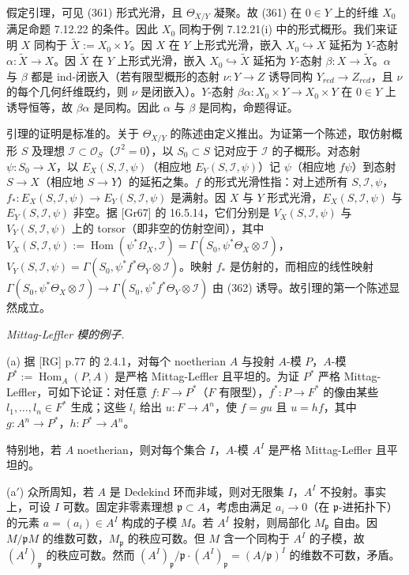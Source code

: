 假定引理，可见 (361) 形式光滑，且 $\Theta_{X/Y}$ 凝聚。故 (361) 在 $0\in Y$ 上的纤维 $X_0$ 满足命题 7.12.22 的条件。因此 $X_0$ 同构于例 7.12.21(i) 中的形式概形。我们来证明 $X$ 同构于 $\tilde X:=X_0\times Y$。因 $X$ 在 $Y$ 上形式光滑，嵌入 $X_0\hookrightarrow X$ 延拓为 $Y$-态射 $\alpha:\tilde X\to X$。因 $\tilde X$ 在 $Y$ 上形式光滑，嵌入 $X_0\hookrightarrow\tilde X$ 延拓为 $Y$-态射 $\beta:X\to\tilde X$。$\alpha$ 与 $\beta$ 都是 ind-闭嵌入（若有限型概形的态射 $\nu:Y\to Z$ 诱导同构 $Y_{red}\to Z_{red}$，且 $\nu$ 的每个几何纤维既约，则 $\nu$ 是闭嵌入）。$Y$-态射 $\beta\alpha:X_0\times Y\to X_0\times Y$
%
在 $0\in Y$ 上诱导恒等，故 $\beta\alpha$ 是同构。因此 $\alpha$ 与 $\beta$ 是同构，命题得证。

引理的证明是标准的。关于 $\Theta_{X/Y}$ 的陈述由定义推出。为证第一个陈述，取仿射概形 $S$ 及理想 $\mathcal{I}\subset\mathcal{O}_S$（$\mathcal{I}^2=0$），以 $S_0\subset S$ 记对应于 $\mathcal{I}$ 的子概形。对态射 $\psi:S_0\to X$，以 $E_X(S,\mathcal{I},\psi)$（相应地 $E_Y(S,\mathcal{I},\psi)$）记 $\psi$（相应地 $f\psi$）到态射 $S\to X$（相应地 $S\to Y$）的延拓之集。$f$ 的形式光滑性指：对上述所有 $S,\mathcal{I},\psi$，$f_*:E_X(S,\mathcal{I},\psi)\to E_Y(S,\mathcal{I},\psi)$ 是满射。因 $X$ 与 $Y$ 形式光滑，$E_X(S,\mathcal{I},\psi)$ 与 $E_Y(S,\mathcal{I},\psi)$ 非空。据 [Gr67] 的 16.5.14，它们分别是 $V_X(S,\mathcal{I},\psi)$ 与 $V_Y(S,\mathcal{I},\psi)$ 上的 torsor（即非空的仿射空间），其中 $V_X(S,\mathcal{I},\psi):=\operatorname{Hom}(\psi^*\Omega_X,\mathcal{I})=\Gamma(S_0,\psi^*\Theta_X\otimes\mathcal{I})$，$V_Y(S,\mathcal{I},\psi)=\Gamma(S_0,\psi^*f^*\Theta_Y\otimes\mathcal{I})$。映射 $f_*$ 是仿射的，而相应的线性映射 $\Gamma(S_0,\psi^*\Theta_X\otimes\mathcal{I})\to\Gamma(S_0,\psi^*f^*\Theta_Y\otimes\mathcal{I})$ 由 (362) 诱导。故引理的第一个陈述显然成立。

 \emph{Mittag-Leffler 模的例子.}

(a) 据 [RG] p.77 的 2.4.1，对每个 noetherian $A$ 与投射 $A$-模 $P$，$A$-模 $P^*:=\operatorname{Hom}_A(P,A)$ 是严格 Mittag-Leffler 且平坦的。为证 $P^*$ 严格 Mittag-Leffler，可如下论证：对任意 $f:F\to P^*$（$F$ 有限型），$f^*:P\to F^*$ 的像由某些 $l_1,\ldots,l_n\in F^*$ 生成；这些 $l_i$ 给出 $u:F\to A^n$，使 $f=gu$ 且 $u=hf$，其中 $g:A^n\to P^*$，$h:P^*\to A^n$。

特别地，若 $A$ noetherian，则对每个集合 $I$，$A$-模 $A^I$ 是严格 Mittag-Leffler 且平坦的。

(a$'$) 众所周知，若 $A$ 是 Dedekind 环而非域，则对无限集 $I$，$A^I$ 不投射。事实上，可设 $I$ 可数。固定非零素理想 $\mathfrak{p}\subset A$，考虑由满足 $a_i\to 0$（在 $\mathfrak{p}$-进拓扑下）的元素 $a=(a_i)\in A^I$ 构成的子模 $M$。若 $A^I$ 投射，则局部化 $M_{\mathfrak{p}}$ 自由。因 $M/\mathfrak{p}M$ 的维数可数，$M_{\mathfrak{p}}$ 的秩应可数。但 $M$ 含一个同构于 $A^I$ 的子模，故 $(A^I)_{\mathfrak{p}}$ 的秩应可数。然而 $(A^I)_{\mathfrak{p}}/\mathfrak{p}\cdot(A^I)_{\mathfrak{p}}=(A/\mathfrak{p})^I$ 的维数不可数，矛盾。

